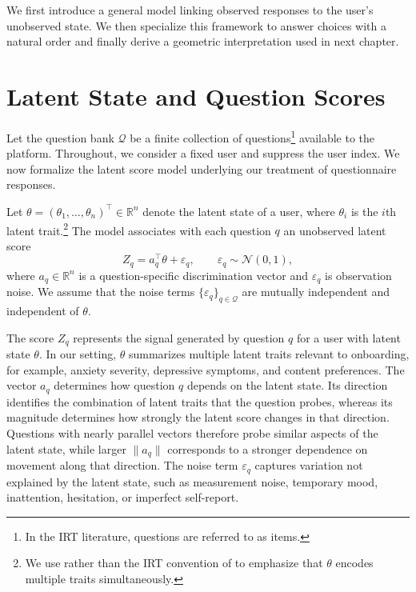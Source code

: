 \documentclass{article}
\begin{document}
We first introduce a general model linking observed responses to the user's unobserved state. We then specialize this framework to answer choices with a natural order and finally derive a geometric interpretation used in next chapter.

\section{Latent State and Question Scores}\label{sec:var}

Let the question bank $\mathcal{Q}$ be a finite collection of questions\footnote{In the IRT literature, questions are referred to as items.} available to
the platform. Throughout, we consider a fixed user and suppress the user
index. We now formalize the latent score model underlying our treatment of questionnaire responses.

\begin{definition}\label{def:latvar}
   Let $\theta = (\theta_1,\dots,\theta_n)^\top \in \mathbb{R}^n$ denote the latent
state of a user, where $\theta_i$ is the $i$th latent trait.\footnote{We use  rather than the IRT convention of  to emphasize that $\theta$
encodes multiple traits simultaneously.} The model associates with each question $q$
an unobserved latent score
 \begin{equation*}
     Z_q = a_q^\top \theta + \varepsilon_q, \qquad \varepsilon_q \sim \mathcal{N}(0, 1), 
 \end{equation*}
where \(a_q \in \mathbb{R}^n\) is a question-specific discrimination vector and
\(\varepsilon_q\) is observation noise. We assume that the noise terms
\(\{\varepsilon_q\}_{q\in\mathcal Q}\) are mutually independent and independent of
\(\theta\).


\end{definition}

The score \(Z_q\) represents the signal generated by question \(q\) for a user with
latent state \(\theta\). In our setting, $\theta$ summarizes multiple latent traits relevant to onboarding, for example, anxiety severity, depressive symptoms, and content preferences.
The vector $a_q$ determines how question $q$ depends on the latent state. Its
direction identifies the combination of latent traits that the question probes,
whereas its magnitude determines how strongly the latent score changes in that
direction. Questions with nearly parallel vectors therefore probe similar aspects
of the latent state, while larger $\|a_q\|$ corresponds to a stronger
dependence on movement along that direction.
The noise term
\(\varepsilon_q\) captures variation not explained by the latent state, such as measurement noise, temporary mood,
inattention, hesitation, or imperfect self-report.
\end{document}

